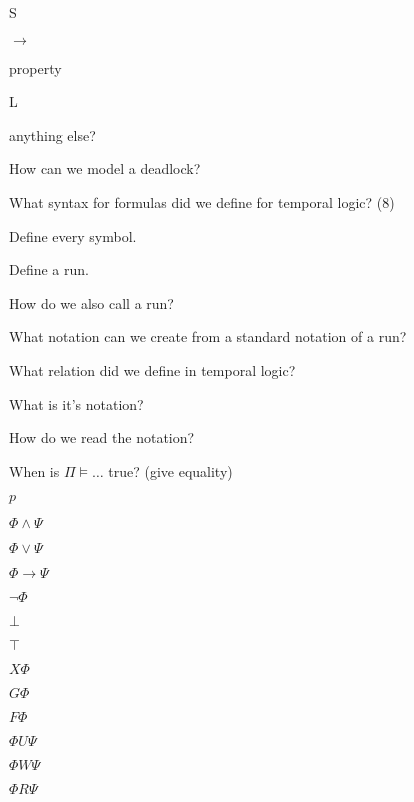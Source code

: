 \documentclass[fleqn]{article}
\begin{document}
\begin{enumerate}
    \begin{itemize}
        {\color{red}\item S}
        {\color{red}\item $\rightarrow$}
        {\color{red}\item property}
        {\color{green}\item L}
        {\color{red}\item anything else?}
    \end{itemize}
    {\color{red}\item How can we model a deadlock?}
    {\color{red}\item What syntax for formulas did we define for temporal logic? (8)}
    {\color{red}\item Define every symbol.}
    {\color{blue}\item Define a run.}
    \item How do we also call a run?
    \item What notation can we create from a standard notation of a run?
    {\color{red}\item What relation did we define in temporal logic?}
    {\color{red}\item What is it's notation?}
    {\color{red}\item How do we read the notation?}
    \item When is $\Pi \models \dots$ true? (give equality)
    \begin{itemize}
        {\color{red}\item $p$}
        \item $\Phi \wedge \Psi$
        \item $\Phi \vee \Psi$
        \item $\Phi \rightarrow \Psi$
        \item $\neg \Phi$
        \item $\bot$
        \item $\top$
        {\color{red}\item $X \Phi$}
        {\color{red}\item $G \Phi$}
        {\color{red}\item $F \Phi$}
        {\color{red}\item $\Phi U \Psi$}
        {\color{red}\item $\Phi W \Psi$}
        {\color{red}\item $\Phi R \Psi$}
    \end{itemize}
\end{enumerate}
\end{document}
